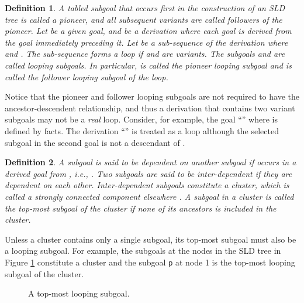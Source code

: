 \documentclass{tlp}
\newtheorem{definition}{Definition} \newtheorem{example}{Example} \newcommand{\pivot}[1]{\mathbin{\, {#1} \,}}
\begin{document}
\begin{definition} A tabled subgoal that occurs first in the construction of an SLD tree is called a {\it pioneer}, and all subsequent variants are called {\it followers} of the pioneer. Let  be a given goal, and  be a {\it derivation} where each goal is derived from the goal immediately preceding it. Let  be a sub-sequence of the derivation where  and . The sub-sequence forms a {\it loop} if  and  are variants. The subgoals  and  are called {\it looping subgoals}. In particular,  is called the {\it pioneer looping subgoal} and  is called the {\it follower looping subgoal} of the loop.
\end{definition}

Notice that the pioneer and follower looping subgoals are not required to have the ancestor-descendent relationship, and thus a derivation that contains two variant subgoals may not be a {\it real} loop. Consider, for example, the goal ``'' where  is defined by facts. The derivation ``''   is treated as a loop although the selected subgoal  in the second goal is not a descendant of .

\begin{definition}  A subgoal  is said to be {\it dependent} on another subgoal  if  occurs in a derived goal from , i.e., . Two subgoals are said to be {\it inter-dependent} if they are dependent on each other. Inter-dependent subgoals constitute a {\it cluster}, which is called a {\it strongly connected component} elsewhere \cite{Sagonas98}. A subgoal in a cluster is called the {\it top-most} subgoal of the cluster if none of its ancestors is included in the cluster.
\end{definition}

Unless a cluster contains only a single subgoal, its top-most subgoal must also be a looping subgoal. For example, the subgoals at the nodes in the SLD tree in Figure \ref{fig:loops} constitute a cluster and the subgoal {\tt p} at node 1 is the top-most looping subgoal of the cluster.

\begin{center}
\begin{figure}
\epsfxsize=4cm 
\caption{\label{fig:loops}A top-most looping subgoal.}
\end{figure}
\end{center}
\end{document}
